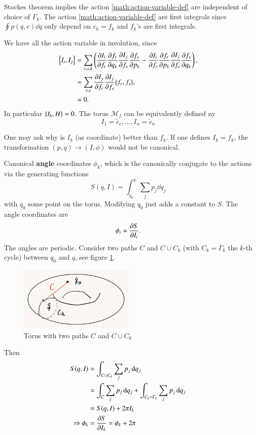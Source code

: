 Stockes theorem implies the action \eqref{math:action-variable-def} are independent of choice of $\Gamma_k$. The action \eqref{math:action-variable-def} are first integrals since $\oint p(q, c) \dd{q}$ only depend on $c_k = f_k$ and $f_k$'s are first integrals.

We have all the action variable in involution, since
\begin{align*}
	\pb{I_i}{I_j} &= \sum_{r, s, k} \left( \pdv{I_i}{f_r} \pdv{f_r}{q_k} \pdv{I_j}{f_s} \pdv{f_s}{p_k} - \pdv{I_i}{f_r} \pdv{f_r}{p_k} \pdv{I_j}{f_s} \pdv{f_s}{q_k} \right),  \\
					  &= \sum_{r,s} \pdv{I_j}{f_r} \pdv{I_j}{f_s} \pb{f_r}{f_s}, \\
					  &=0.
	\label{eq:}
\end{align*}
In particular $\pb{I_k}{H}=0$. The torus $\mathcal{M}_f$ can be equivalently defined ny 
\begin{equation*}
	I_1 = \tilde{c}_c, 	\dots, I_n = \tilde{c}_n
\end{equation*}

One may ask why is $I_k$ (as coordinate) better than $f_k$. If one defines $I_k = f_k$, the transformation $(p, q) \rightarrow (I, \phi)$ would not be canonical. 

Canonical \textbf{angle} coordinates $\phi_k$, which is the canonically conjugate to the actions via the generating functions
\begin{equation}
	S(q, I) = \int_{q_0}^{q} \sum_j p_j \dd{q_j}
\end{equation}
with $q_0$ some point on the torus. Modifying $q_0$ just adds a constant to $S$. The angle coordinates are
\begin{equation*}
	\phi_i = \pdv{S}{I_i}.
\end{equation*}
The angles are periodic. Consider two paths $C$ and $C \cup C_k$ (with $C_k = \Gamma_k$ the $k$-th cycle) between $q_0$ and $q$, see figure \ref{fig:torus-angle}.
\begin{figure}[ht]
	\centering
	\includegraphics[width=0.5\textwidth]{./figs/torus-angle.jpg}
	\caption{Torus with two paths $C$ and $C\cup C_k$}
	\label{fig:torus-angle}
\end{figure}
Then
\begin{align*}
	S(q, I) &= \int_{C\cup C_k} \sum_j p_j \dd{q_j} \\
			  &= \int_{C} \sum_j p_j \dd{q_j} + \int_{C_k = \Gamma_k} \sum_j p_j \dd{q_j} \\
			  &= S(q, I) + 2\pi I_k \\
	\Rightarrow \phi_k &= \pdv{S}{I_k} = \phi_k + 2\pi
	\label{eq:}
\end{align*}

